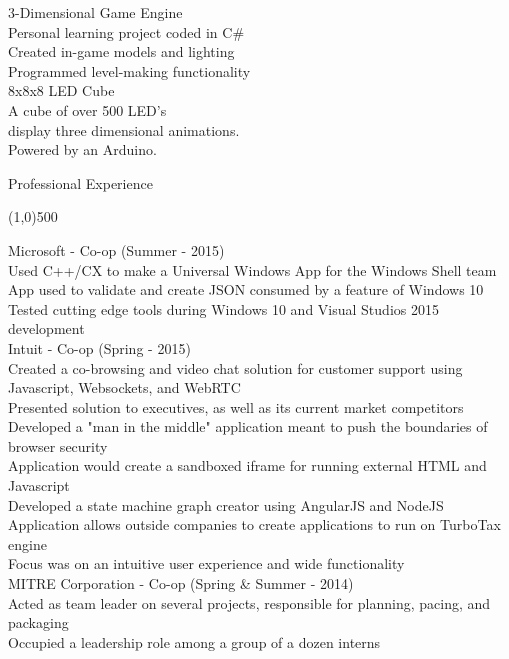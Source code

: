 \documentclass{article}
\begin{document}
\begin{minipage}[t]{0.5\textwidth}
  {\large 3-Dimensional Game Engine } \\
  Personal learning project coded in C\# \\
  Created in-game models and lighting  \\
  Programmed level-making functionality \\
  {\large 8x8x8 LED Cube } \\
  A cube of over 500 LED's \\
  display three dimensional animations. \\
  Powered by an Arduino. \\
\end{minipage}
{\Large Professional Experience } \\
\begin{center}
  \line(1,0){500}
\end{center}
{\large Microsoft - Co-op (Summer - 2015) } \\
Used C++/CX to make a Universal Windows App for the Windows Shell team \\
App used to validate and create JSON consumed by a feature of Windows 10 \\
Tested cutting edge tools during Windows 10 and Visual Studios 2015 development \\
{\large Intuit - Co-op (Spring - 2015) } \\
Created a co-browsing and video chat solution for customer support using Javascript, Websockets, and WebRTC \\
Presented solution to executives, as well as its current market competitors \\
Developed a "man in the middle" application meant to push the boundaries of browser security \\
Application would create a sandboxed iframe for running external HTML and Javascript \\
Developed a state machine graph creator using AngularJS and NodeJS \\
Application allows outside companies to create applications to run on TurboTax engine \\
Focus was on an intuitive user experience and wide functionality \\
{\large MITRE Corporation - Co-op (Spring \& Summer - 2014) } \\
Acted as team leader on several projects, responsible for planning, pacing, and packaging \\
Occupied a leadership role among a group of a dozen interns \\
\end{document}
